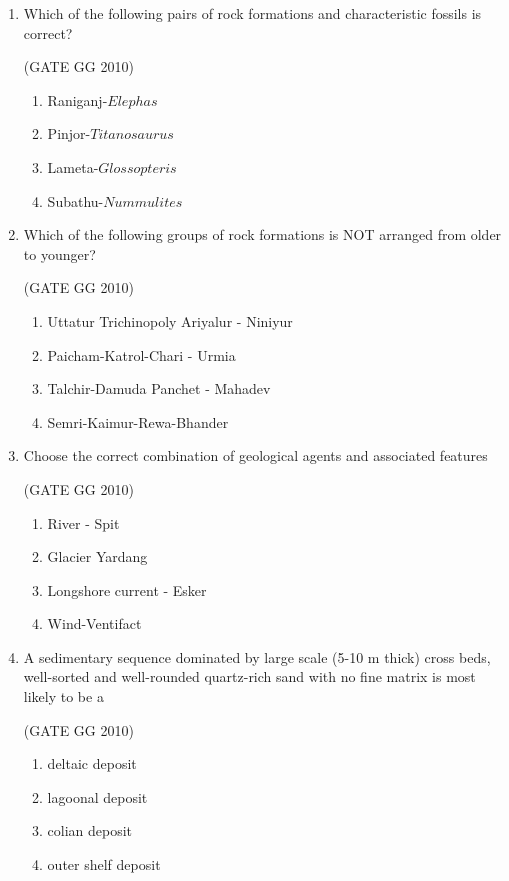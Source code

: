 \documentclass[journal]{IEEEtran}
\begin{document}
\begin{enumerate}[start=1]
\item Which of the following pairs of rock formations and characteristic fossils is correct?

\hfill{(GATE GG 2010)}\\

\begin{enumerate}
    \item Raniganj-$Elephas$
    \item Pinjor-$Titanosaurus$
    \item Lameta-$Glossopteris$
    \item Subathu-$Nummulites$
\end{enumerate}

\item Which of the following groups of rock formations is NOT arranged from older to younger?

\hfill{(GATE GG 2010)}\\

\begin{enumerate}
    \item Uttatur Trichinopoly Ariyalur - Niniyur
    \item Paicham-Katrol-Chari - Urmia
    \item Talchir-Damuda Panchet - Mahadev
    \item Semri-Kaimur-Rewa-Bhander
\end{enumerate}

\item Choose the correct combination of geological agents and associated features

\hfill{(GATE GG 2010)}\\

\begin{enumerate}
    \item River - Spit
    \item Glacier Yardang
    \item Longshore current - Esker
    \item Wind-Ventifact
\end{enumerate}

\item A sedimentary sequence dominated by large scale (5-10 m thick) cross beds, well-sorted and well-rounded quartz-rich sand with no fine matrix is most likely to be a

\hfill{(GATE GG 2010)}\\

\begin{enumerate}
    \item deltaic deposit
    \item lagoonal deposit
    \item colian deposit
    \item outer shelf deposit
\end{enumerate}


\end{enumerate}
\end{document}
